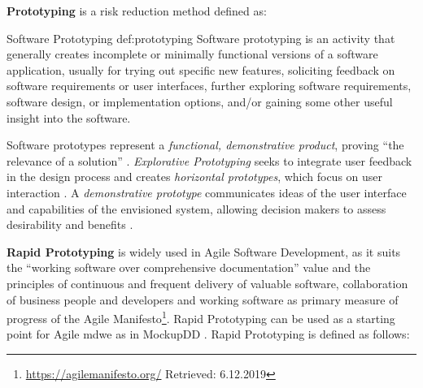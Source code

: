 \textbf{Prototyping} is a risk reduction method  \autocite{ISO/IEEE24765Vocabulary}
defined as:
\vspace{-10pt}

\begin{thesisdefinition}{Software Prototyping \autocite{SWEBOK2014}}{def:prototyping}
Software prototyping is an activity that generally creates incomplete or minimally functional versions of a software application, usually for trying out specific new features, soliciting feedback on software requirements or user interfaces, further exploring software requirements, software design, or implementation options, and/or gaining some other useful insight into the software.
\end{thesisdefinition}

Software prototypes represent a \emph{functional, demonstrative product}, proving ``the relevance of a solution'' \autocite{ISO/IEEE24765Vocabulary}.
\emph{Explorative \gls{Prototyping}} seeks to integrate user feedback in the design process and creates \emph{horizontal prototypes}, which focus on user interaction \autocite{Wallmueller2001SoftwareQuality}.
A \emph{demonstrative prototype} communicates ideas of the user interface and capabilities of the envisioned system, allowing decision makers to assess desirability and benefits \autocite{Wallmueller2001SoftwareQuality}.

\textbf{\gls{Rapid Prototyping}} is widely used in Agile Software Development, as it suits the ``working software over comprehensive documentation'' value \autocite{Fowler2001} and the principles of continuous and frequent delivery of valuable software, collaboration of business people and developers and working software as primary measure of progress of the Agile Manifesto\footnote{\url{https://agilemanifesto.org/} Retrieved: 6.12.2019}.
\gls{Rapid Prototyping} can be used as a starting point for Agile \gls{mdwe} as in MockupDD \autocite{Rivero2013MockupDD,Rivero2013,Rivero2014Electra}.
\gls{Rapid Prototyping} is defined as follows:

